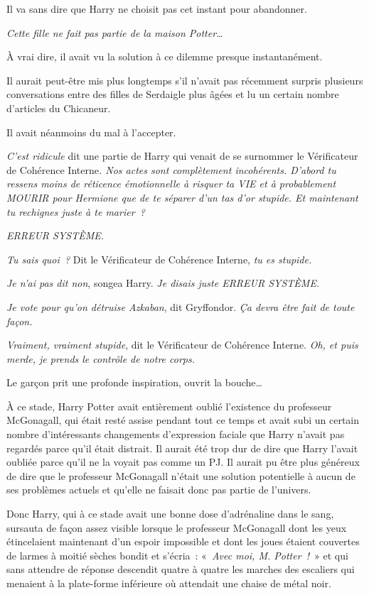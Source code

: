 Il va sans dire que Harry ne choisit pas cet instant pour abandonner.

\emph{Cette fille ne fait pas partie de la maison Potter…}

À vrai dire, il avait vu la solution à ce dilemme presque instantanément.

Il aurait peut-être mis plus longtemps s'il n'avait pas récemment surpris plusieurs conversations entre des filles de Serdaigle plus âgées et lu un certain nombre d'articles du Chicaneur.

Il avait néanmoins du mal à l'accepter.

\emph{C'est ridicule} dit une partie de Harry qui venait de se surnommer le Vérificateur de Cohérence Interne\emph{. Nos actes sont complètement incohérents. D'abord tu ressens moins de réticence émotionnelle à risquer ta VIE et à probablement MOURIR pour Hermione que de te séparer d'un tas d'or stupide. Et maintenant tu rechignes juste à te marier~?}

\emph{ERREUR SYSTÈME.}

\emph{Tu sais quoi~?} Dit le Vérificateur de Cohérence Interne, \emph{tu es stupide.}

\emph{Je n'ai pas dit non}, songea Harry. \emph{Je disais juste ERREUR SYSTÈME.}

\emph{Je vote pour qu'on détruise Azkaban}, dit Gryffondor. \emph{Ça devra être fait de toute façon.}

\emph{Vraiment, vraiment stupide}, dit le Vérificateur de Cohérence Interne. \emph{Oh, et puis merde, je prends le contrôle de notre corps.}

Le garçon prit une profonde inspiration, ouvrit la bouche…

À ce stade, Harry Potter avait entièrement oublié l'existence du professeur McGonagall, qui était resté assise pendant tout ce temps et avait subi un certain nombre d'intéressants changements d'expression faciale que Harry n'avait pas regardés parce qu'il était distrait. Il aurait été trop dur de dire que Harry l'avait oubliée parce qu'il ne la voyait pas comme un PJ. Il aurait pu être plus généreux de dire que le professeur McGonagall n'était une solution potentielle à aucun de ses problèmes actuels et qu'elle ne faisait donc pas partie de l'univers.

Donc Harry, qui à ce stade avait une bonne dose d'adrénaline dans le sang, sursauta de façon assez visible lorsque le professeur McGonagall dont les yeux étincelaient maintenant d'un espoir impossible et dont les joues étaient couvertes de larmes à moitié sèches bondit et s'écria~: «~\emph{Avec moi, M. Potter~!}~» et qui sans attendre de réponse descendit quatre à quatre les marches des escaliers qui menaient à la plate-forme inférieure où attendait une chaise de métal noir.

